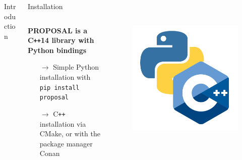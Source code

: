 \documentclass[t]{beamer}
\newlength{\itemseparation}
\begin{document}
\begin{columns}[onlytextwidth]
\begin{column}{0.6\textwidth}
\begin{block}[equal height group=A]{Introduction}
      \end{block}
    \end{column}
    \begin{column}{0.4\textwidth}%
      \begin{block}[equal height group=A]{Installation}%
        \begin{columns}[onlytextwidth]
          \begin{column}{0.7\textwidth}%
            \textbf{PROPOSAL is a C\texttt{++}14 library with Python bindings}
            \begin{itemize}
              \setlength\itemsep{\itemseparation}
              \item[$\rightarrow$] Simple Python installation with \colorbox{tuYellow}{\texttt{pip install proposal}}
              \item[$\rightarrow$] C\texttt{++} installation via CMake, or with the package manager Conan
            \end{itemize}
          \end{column}
          \begin{column}{0.3\textwidth}%
            \vspace{-1.3cm}
            \begin{figure}
              \includegraphics[width=0.75\linewidth, keepaspectratio]{images/cpp-python.png}
            \end{figure}
          \end{column}
        \end{columns}
      \end{block}
    \end{column}
    \end{columns}
\end{document}
